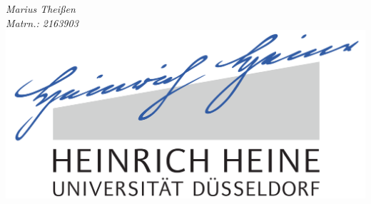 \documentclass[
11pt, %
english, %
singlespacing, %
headsepline, %
]{MastersDoctoralThesis} %
\author{John \textsc{Smith}} %
\begin{document}
\frontmatter %

\pagestyle{plain} %


\begin{titlepage}
\begin{center}

\vspace*{.06\textheight}
{\scshape\LARGE \univname\par}\vspace{1.5cm} %

\HRule \\[0.4cm] %
{\huge \bfseries \ttitle\par}\vspace{0.4cm} %
\HRule \\[1.5cm] %
 
{\Large \textit{Marius Thei\ss{}en \\ Matrn.: 2163903}}\\[0.5cm] 
% 
% 
\vfill
\includegraphics[scale=0.11]{Logo} %


\end{center}
\end{titlepage}
\end{document}
